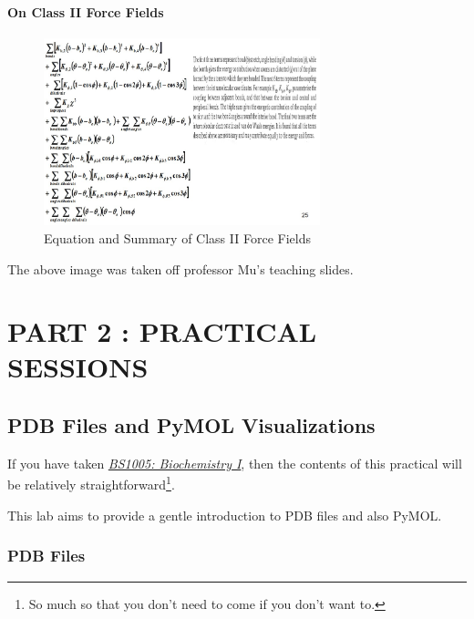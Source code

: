 \documentclass[
  letterpaper,
  DIV=11,
  numbers=noendperiod]{scrreprt}
\begin{document}
\hypertarget{on-class-ii-force-fields}{%
\subsection{On Class II Force Fields}\label{on-class-ii-force-fields}}

\begin{figure}

{\centering \includegraphics[width=3.16in,height=\textheight]{./images/wk2/classii.jpg}

}

\caption{Equation and Summary of Class II Force Fields}

\end{figure}

The above image was taken off professor Mu's teaching slides.

\part{\textbf{PART 2 : PRACTICAL SESSIONS}}

\hypertarget{pdb-files-and-pymol-visualizations}{%
\chapter{PDB Files and PyMOL
Visualizations}\label{pdb-files-and-pymol-visualizations}}

If you have taken
\href{https://labs.sbs.ntu.edu.sg/obtl/obtl.aspx?sch=sbs\&p=BS1005}{\emph{BS1005:
Biochemistry I}}, then the contents of this practical will be relatively
straightforward\footnote{So much so that you don't need to come if you
  don't want to.}.

This lab aims to provide a gentle introduction to PDB files and also
PyMOL.

\hypertarget{pdb-files}{%
\section{PDB Files}\label{pdb-files}}
\end{document}
